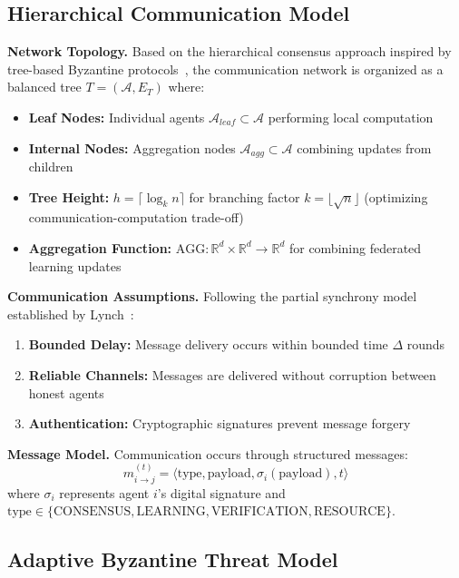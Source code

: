 \documentclass[conference]{IEEEtran}
\begin{document}
\subsection{Hierarchical Communication Model}

\textbf{Network Topology.} Based on the hierarchical consensus approach inspired by tree-based Byzantine protocols~\cite{bracha1987asynchronous}, the communication network is organized as a balanced tree $T = (\mathcal{A}, E_T)$ where:

\begin{itemize}
    \item \textbf{Leaf Nodes:} Individual agents $\mathcal{A}_{leaf} \subset \mathcal{A}$ performing local computation
    \item \textbf{Internal Nodes:} Aggregation nodes $\mathcal{A}_{agg} \subset \mathcal{A}$ combining updates from children
    \item \textbf{Tree Height:} $h = \lceil \log_k n \rceil$ for branching factor $k = \lfloor \sqrt{n} \rfloor$ (optimizing communication-computation trade-off)
    \item \textbf{Aggregation Function:} $\text{AGG}: \mathbb{R}^d \times \mathbb{R}^d \rightarrow \mathbb{R}^d$ for combining federated learning updates
\end{itemize}

\textbf{Communication Assumptions.} Following the partial synchrony model established by Lynch~\cite{lynch1996distributed}:
\begin{enumerate}
    \item \textbf{Bounded Delay:} Message delivery occurs within bounded time $\Delta$ rounds
    \item \textbf{Reliable Channels:} Messages are delivered without corruption between honest agents
    \item \textbf{Authentication:} Cryptographic signatures prevent message forgery
\end{enumerate}

\textbf{Message Model.} Communication occurs through structured messages:
$$m_{i \rightarrow j}^{(t)} = \langle \text{type}, \text{payload}, \sigma_i(\text{payload}), t \rangle$$
where $\sigma_i$ represents agent $i$'s digital signature and $\text{type} \in \{\text{CONSENSUS}, \text{LEARNING}, \text{VERIFICATION}, \text{RESOURCE}\}$.

\subsection{Adaptive Byzantine Threat Model}
\end{document}
